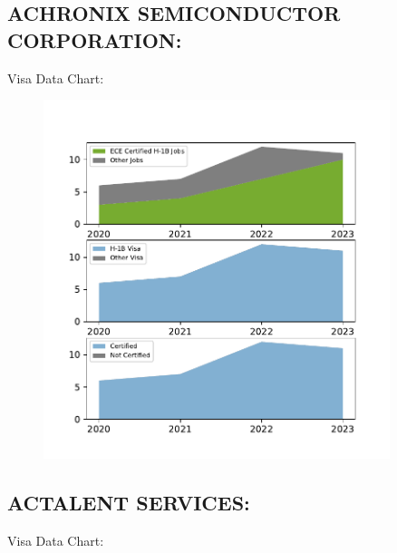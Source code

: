 \documentclass{article}%
\begin{document}
%
\newpage%
\subsection{ACHRONIX SEMICONDUCTOR CORPORATION:}%
\label{subsec:ACHRONIXSEMICONDUCTORCORPORATION}%
Visa Data Chart:%


\begin{figure}[htbp]%
\centering%
\includegraphics[width=0.9\textwidth]{./temp_img/ACHRONIXSEMICONDUCTORCORPORATION_detailed.pdf}%
\end{figure}

%
\newpage%
\subsection{ACTALENT SERVICES:}%
\label{subsec:ACTALENTSERVICES}%
Visa Data Chart:%
\end{document}
